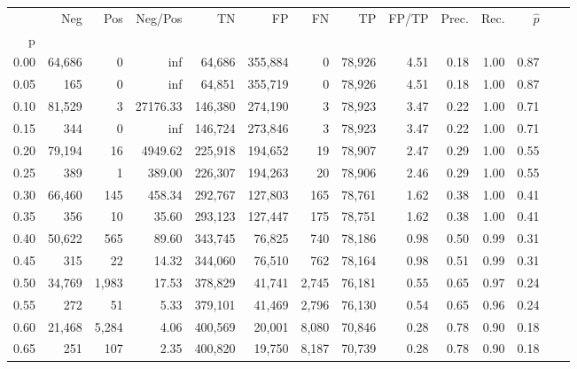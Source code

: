 \begin{tabular}{rrrrrrrrrrrrrr}
\toprule
{} &     Neg &     Pos &   Neg/Pos &       TN &       FP &      FN &      TP & FP/TP & Prec. &  Rec. & $\hat{p}$ \\
p    &         &         &           &          &          &         &         &       &       &       &           \\
\midrule
0.00 &  64,686 &       0 &       inf &   64,686 &  355,884 &       0 &  78,926 &  4.51 &  0.18 &  1.00 &      0.87 \\
0.05 &     165 &       0 &       inf &   64,851 &  355,719 &       0 &  78,926 &  4.51 &  0.18 &  1.00 &      0.87 \\
0.10 &  81,529 &       3 &  27176.33 &  146,380 &  274,190 &       3 &  78,923 &  3.47 &  0.22 &  1.00 &      0.71 \\
0.15 &     344 &       0 &       inf &  146,724 &  273,846 &       3 &  78,923 &  3.47 &  0.22 &  1.00 &      0.71 \\
0.20 &  79,194 &      16 &   4949.62 &  225,918 &  194,652 &      19 &  78,907 &  2.47 &  0.29 &  1.00 &      0.55 \\
0.25 &     389 &       1 &    389.00 &  226,307 &  194,263 &      20 &  78,906 &  2.46 &  0.29 &  1.00 &      0.55 \\
0.30 &  66,460 &     145 &    458.34 &  292,767 &  127,803 &     165 &  78,761 &  1.62 &  0.38 &  1.00 &      0.41 \\
0.35 &     356 &      10 &     35.60 &  293,123 &  127,447 &     175 &  78,751 &  1.62 &  0.38 &  1.00 &      0.41 \\
0.40 &  50,622 &     565 &     89.60 &  343,745 &   76,825 &     740 &  78,186 &  0.98 &  0.50 &  0.99 &      0.31 \\
0.45 &     315 &      22 &     14.32 &  344,060 &   76,510 &     762 &  78,164 &  0.98 &  0.51 &  0.99 &      0.31 \\
0.50 &  34,769 &   1,983 &     17.53 &  378,829 &   41,741 &   2,745 &  76,181 &  0.55 &  0.65 &  0.97 &      0.24 \\
0.55 &     272 &      51 &      5.33 &  379,101 &   41,469 &   2,796 &  76,130 &  0.54 &  0.65 &  0.96 &      0.24 \\
0.60 &  21,468 &   5,284 &      4.06 &  400,569 &   20,001 &   8,080 &  70,846 &  0.28 &  0.78 &  0.90 &      0.18 \\
0.65 &     251 &     107 &      2.35 &  400,820 &   19,750 &   8,187 &  70,739 &  0.28 &  0.78 &  0.90 &      0.18 \\

\end{tabular}
